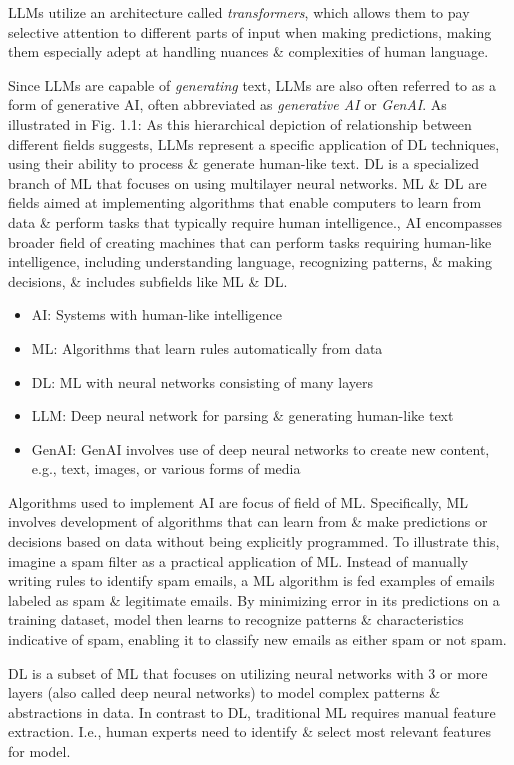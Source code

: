 \documentclass{article}
\begin{document}
\begin{itemize}
\begin{itemize}
		LLMs utilize an architecture called {\it transformers}, which allows them to pay selective attention to different parts of input when making predictions, making them especially adept at handling nuances \& complexities of human language.
		
		Since LLMs are capable of {\it generating} text, LLMs are also often referred to as a form of generative AI, often abbreviated as {\it generative AI} or {\it GenAI}. As illustrated in {\sf Fig. 1.1: As this hierarchical depiction of relationship between different fields suggests, LLMs represent a specific application of DL techniques, using their ability to process \& generate human-like text. DL is a specialized branch of ML that focuses on using multilayer neural networks. ML \& DL are fields aimed at implementing algorithms that enable computers to learn from data \& perform tasks that typically require human intelligence.}, AI encompasses broader field of creating machines that can perform tasks requiring human-like intelligence, including understanding language, recognizing patterns, \& making decisions, \& includes subfields like ML \& DL.
		\begin{itemize}
			\item AI: Systems with human-like intelligence
			\item ML: Algorithms that learn rules automatically from data
			\item DL: ML with neural networks consisting of many layers
			\item LLM: Deep neural network for parsing \& generating human-like text
			\item GenAI: GenAI involves use of deep neural networks to create new content, e.g., text, images, or various forms of media
		\end{itemize}
		Algorithms used to implement AI are focus of field of ML. Specifically, ML involves development of algorithms that can learn from \& make predictions or decisions based on data without being explicitly programmed. To illustrate this, imagine a spam filter as a practical application of ML. Instead of manually writing rules to identify spam emails, a ML algorithm is fed examples of emails labeled as spam \& legitimate emails. By minimizing error in its predictions on a training dataset, model then learns to recognize patterns \& characteristics indicative of spam, enabling it to classify new emails as either spam or not spam.
		
		DL is a subset of ML that focuses on utilizing neural networks with 3 or more layers (also called deep neural networks) to model complex patterns \& abstractions in data. In contrast to DL, traditional ML requires manual feature extraction. I.e., human experts need to identify \& select most relevant features for model.
		

\end{itemize}
\end{itemize}
\end{document}
